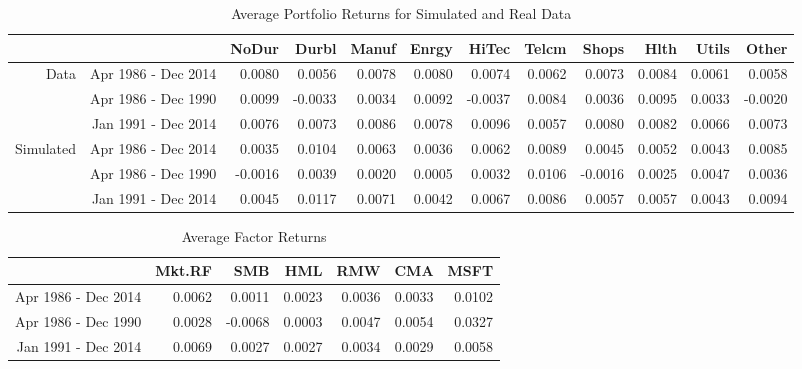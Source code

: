 \begin{table}[ht]
	\footnotesize
	\centering
	\begin{tabular}{rrrrrrrrrrrr}
		\hline
		& & NoDur & Durbl & Manuf & Enrgy & HiTec & Telcm & Shops & Hlth & Utils & Other \\ 
		\hline
		\multirow{3}{*}{Data} & Apr 1986 - Dec 2014 & 0.0080 & 0.0056 & 0.0078 & 0.0080 & 0.0074 & 0.0062 & 0.0073 & 0.0084 & 0.0061 & 0.0058 \\ 
		& Apr 1986 - Dec 1990 & 0.0099 & -0.0033 & 0.0034 & 0.0092 & -0.0037 & 0.0084 & 0.0036 & 0.0095 & 0.0033 & -0.0020 \\ 
		& Jan 1991 - Dec 2014 & 0.0076 & 0.0073 & 0.0086 & 0.0078 & 0.0096 & 0.0057 & 0.0080 & 0.0082 & 0.0066 & 0.0073 \\ 
		\hline
		\multirow{3}{*}{Simulated} & Apr 1986 - Dec 2014 & 0.0035 & 0.0104 & 0.0063 & 0.0036 & 0.0062 & 0.0089 & 0.0045 & 0.0052 & 0.0043 & 0.0085 \\ 
		& Apr 1986 - Dec 1990 & -0.0016 & 0.0039 & 0.0020 & 0.0005 & 0.0032 & 0.0106 & -0.0016 & 0.0025 & 0.0047 & 0.0036 \\ 
		& Jan 1991 - Dec 2014 & 0.0045 & 0.0117 & 0.0071 & 0.0042 & 0.0067 & 0.0086 & 0.0057 & 0.0057 & 0.0043 & 0.0094 \\ 
		\hline
	\end{tabular}
	\caption{Average Portfolio Returns for Simulated and Real Data}
\end{table}
\begin{table}[ht]
	\centering
	\footnotesize
	\begin{tabular}{rrrrrrr}
		\hline
		& Mkt.RF & SMB & HML & RMW & CMA & MSFT \\ 
		\hline
		 Apr 1986 - Dec 2014 & 0.0062 & 0.0011 & 0.0023 & 0.0036 & 0.0033 & 0.0102 \\ 
		Apr 1986 - Dec 1990 & 0.0028 & -0.0068 & 0.0003 & 0.0047 & 0.0054 & 0.0327 \\ 
		Jan 1991 - Dec 2014 & 0.0069 & 0.0027 & 0.0027 & 0.0034 & 0.0029 & 0.0058 \\ 
		\hline
	\end{tabular}
		\caption{Average Factor Returns}
\end{table}
